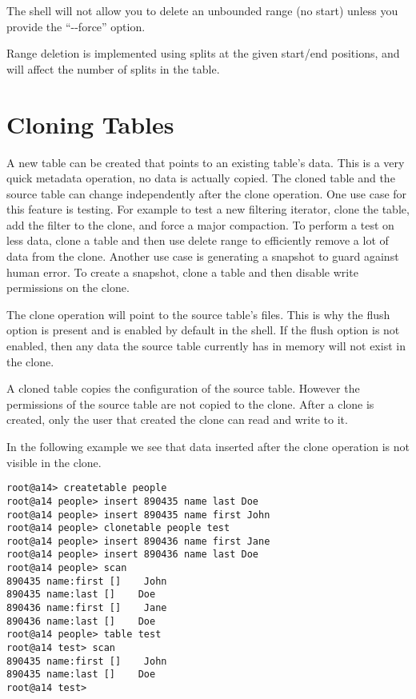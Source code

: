 The shell will not allow you to delete an unbounded range (no start)
unless you provide the ``-{}-force'' option.

Range deletion is implemented using splits at the given start/end
positions, and will affect the number of splits in the table.

\section{Cloning Tables}

A new table can be created that points to an existing table's data. This is a
very quick metadata operation, no data is actually copied. The cloned table
and the source table can change independently after the clone operation. One
use case for this feature is testing. For example to test a new filtering
iterator, clone the table, add the filter to the clone, and force a major
compaction. To perform a test on less data, clone a table and then use delete
range to efficiently remove a lot of data from the clone. Another use case is
generating a snapshot to guard against human error. To create a snapshot,
clone a table and then disable write permissions on the clone.

The clone operation will point to the source table's files. This is why the
flush option is present and is enabled by default in the shell. If the flush
option is not enabled, then any data the source table currently has in memory
will not exist in the clone.

A cloned table copies the configuration of the source table. However the
permissions of the source table are not copied to the clone. After a clone is
created, only the user that created the clone can read and write to it.

In the following example we see that data inserted after the clone operation is
not visible in the clone.

\begingroup\fontsize{8pt}{8pt}\selectfont\begin{verbatim}
root@a14> createtable people
root@a14 people> insert 890435 name last Doe
root@a14 people> insert 890435 name first John
root@a14 people> clonetable people test  
root@a14 people> insert 890436 name first Jane
root@a14 people> insert 890436 name last Doe  
root@a14 people> scan
890435 name:first []    John
890435 name:last []    Doe
890436 name:first []    Jane
890436 name:last []    Doe
root@a14 people> table test
root@a14 test> scan
890435 name:first []    John
890435 name:last []    Doe
root@a14 test> 
\end{verbatim}\endgroup

